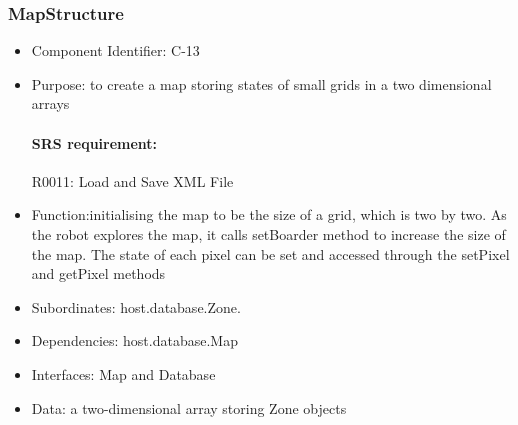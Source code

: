 \documentclass[11pt, a4paper]{report}
\begin{document}
\subsubsection{MapStructure}
\begin{itemize}
\item Component Identifier: C-13
\item Purpose: to create a map storing states of small grids in a two dimensional arrays
\paragraph{SRS requirement:} R0011: Load and Save XML File
\item Function:initialising the map to be the size of a grid, which is two by two. As the robot
 explores the map, it calls setBoarder method to increase the size of the map. The state of each
 pixel can be set and accessed through the setPixel and getPixel methods

\item Subordinates: host.database.Zone.
\item Dependencies: host.database.Map
\item Interfaces: Map and Database
\item Data: a two-dimensional array storing Zone objects
\end{itemize}

\end{document}
